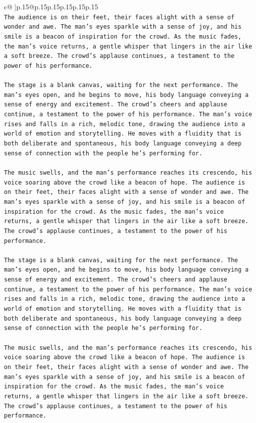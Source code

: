 \documentclass{article}
\begin{document}
{\begin{supertabular}{c@{$\;$}|p{.15\linewidth}@{}p{.15\linewidth}p{.15\linewidth}p{.15\linewidth}p{.15\linewidth}p{.15\linewidth}}
{{{\\ 
\texttt{The audience is on their feet, their faces alight with a sense of wonder and awe. The man's eyes sparkle with a sense of joy, and his smile is a beacon of inspiration for the crowd. As the music fades, the man's voice returns, a gentle whisper that lingers in the air like a soft breeze. The crowd's applause continues, a testament to the power of his performance.} \\
\\ 
\texttt{The stage is a blank canvas, waiting for the next performance. The man's eyes open, and he begins to move, his body language conveying a sense of energy and excitement. The crowd's cheers and applause continue, a testament to the power of his performance. The man's voice rises and falls in a rich, melodic tone, drawing the audience into a world of emotion and storytelling. He moves with a fluidity that is both deliberate and spontaneous, his body language conveying a deep sense of connection with the people he's performing for.} \\
\\ 
\texttt{The music swells, and the man's performance reaches its crescendo, his voice soaring above the crowd like a beacon of hope. The audience is on their feet, their faces alight with a sense of wonder and awe. The man's eyes sparkle with a sense of joy, and his smile is a beacon of inspiration for the crowd. As the music fades, the man's voice returns, a gentle whisper that lingers in the air like a soft breeze. The crowd's applause continues, a testament to the power of his performance.} \\
\\ 
\texttt{The stage is a blank canvas, waiting for the next performance. The man's eyes open, and he begins to move, his body language conveying a sense of energy and excitement. The crowd's cheers and applause continue, a testament to the power of his performance. The man's voice rises and falls in a rich, melodic tone, drawing the audience into a world of emotion and storytelling. He moves with a fluidity that is both deliberate and spontaneous, his body language conveying a deep sense of connection with the people he's performing for.} \\
\\ 
\texttt{The music swells, and the man's performance reaches its crescendo, his voice soaring above the crowd like a beacon of hope. The audience is on their feet, their faces alight with a sense of wonder and awe. The man's eyes sparkle with a sense of joy, and his smile is a beacon of inspiration for the crowd. As the music fades, the man's voice returns, a gentle whisper that lingers in the air like a soft breeze. The crowd's applause continues, a testament to the power of his performance.} \\
}}}
\end{supertabular}}
\end{document}
